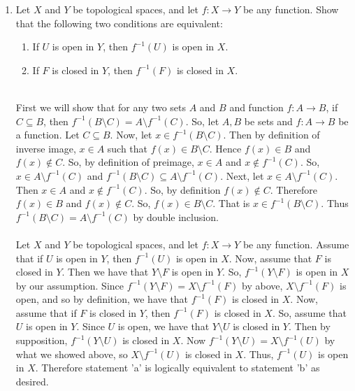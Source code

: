 \documentclass[12pt]{article}
\begin{document}
\begin{enumerate}
\item Let $X$ and $Y$ be topological spaces, and let $f:X\to Y$ be any function. Show that the following two conditions are equivalent:
\begin{enumerate}\item If $U$ is open in $Y$, then $f^{-1}(U)$ is open in $X$.
\item If $F$ is closed in $Y$, then $f^{-1}(F)$ is closed in $X$.\\\\ \end{enumerate}
First we will show that for any two sets $A$ and $B$ and function $f:A\rightarrow B$, if $C\subseteq B$, then $f^{-1}(B\setminus C)=A\setminus f^{-1}(C)$. So, let $A,B$ be sets and $f:A\rightarrow B$ be a function. Let $C\subseteq B$. Now, let $x\in f^{-1}(B\setminus C)$. Then by definition of inverse image, $x\in A$ such that $f(x)\in B\setminus C$. Hence $f(x)\in B$ and $f(x)\notin C$. So, by definition of preimage, $x\in A$ and $x\notin f^{-1}(C)$. So, $x\in A\setminus f^{-1}(C)$ and $f^{-1}(B\setminus C)\subseteq A\setminus f^{-1}(C)$. Next, let $x\in A\setminus f^{-1}(C)$. Then $x\in A$ and $x\notin f^{-1}(C)$. So, by definition $f(x)\notin C$. Therefore $f(x)\in B$ and $f(x)\notin C$. So, $f(x)\in B\setminus C$. That is $x\in f^{-1}(B\setminus C)$. Thus $f^{-1}(B\setminus C)=A\setminus f^{-1}(C)$ by double inclusion.\\\\Let $X$ and $Y$ be topological spaces, and let $f:X\to Y$ be any function. Assume that if $U$ is open in $Y$, then $f^{-1}(U)$ is open in $X$. Now, assume that $F$ is closed in $Y$. Then we have that $Y\setminus F$ is open in $Y$. So, $f^{-1}(Y\setminus F)$ is open in $X$ by our assumption. Since $f^{-1}(Y\setminus F)=X\setminus f^{-1}(F)$ by above, $X\setminus f^{-1}(F)$ is open, and so by definition, we have that $f^{-1}(F)$ is closed in $X$. Now, assume that if $F$ is closed in $Y$, then $f^{-1}(F)$ is closed in $X$. So, assume that $U$ is open in $Y$. Since $U$ is open, we have that $Y\setminus U$ is closed in $Y$. Then by supposition, $f^{-1}(Y\setminus U)$ is closed in $X$. Now $f^{-1}(Y\setminus U)=X\setminus f^{-1}(U)$ by what we showed above, so $X\setminus f^{-1}(U)$ is closed in $X$. Thus, $f^{-1}(U)$ is open in $X$. Therefore statement 'a' is logically equivalent to statement 'b' as desired.\\[20pt]


\end{enumerate}
\end{document}
